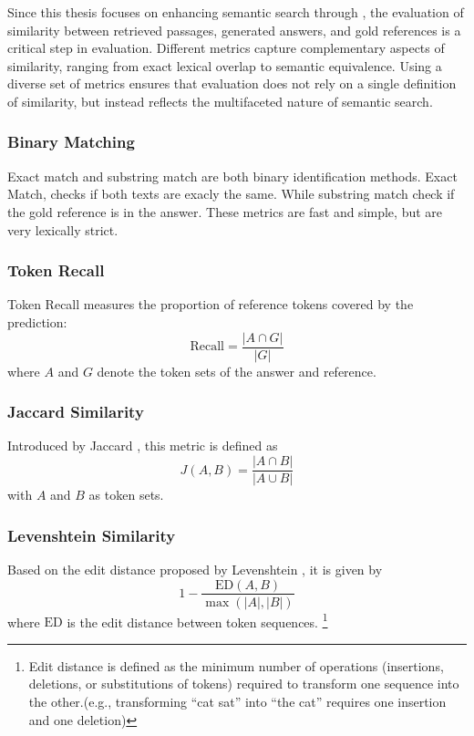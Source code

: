 Since this thesis focuses on enhancing semantic search through , the evaluation of similarity between retrieved passages, generated answers, and gold references is a critical step in evaluation. Different metrics capture complementary aspects of similarity, ranging from exact lexical overlap to semantic equivalence. Using a diverse set of metrics ensures that evaluation does not rely on a single definition of similarity, but instead reflects the multifaceted nature of semantic search.
\subsubsection{Binary Matching}
Exact match and substring match are both binary identification methods. Exact Match, checks if both texts are exacly the same. While substring match check if the gold reference is in the answer. These metrics are fast and simple, but are very lexically strict.

\subsubsection{Token Recall} 
Token Recall measures the proportion of reference tokens covered by the prediction:
\[
\text{Recall} = \frac{|A \cap G|}{|G|}
\]
where \(A\) and \(G\) denote the token sets of the answer and reference.  

\subsubsection{Jaccard Similarity} 
Introduced by Jaccard \cite{jaccard1901distribution}, this metric is defined as
\[
J(A,B) = \frac{|A \cap B|}{|A \cup B|}
\]
with \(A\) and \(B\) as token sets.  

\subsubsection{Levenshtein Similarity} 
Based on the edit distance proposed by Levenshtein \cite{levenshtein1966binary}, it is given by
\[
1 - \frac{\text{ED}(A,B)}{\max(|A|,|B|)}
\]
where \(\text{ED}\) is the edit distance between token sequences.  
\footnote{Edit distance is defined as the minimum number of operations (insertions, deletions, or substitutions of tokens) required to transform one sequence into the other.(e.g., transforming “cat sat” into “the cat” requires one insertion and one deletion)}

